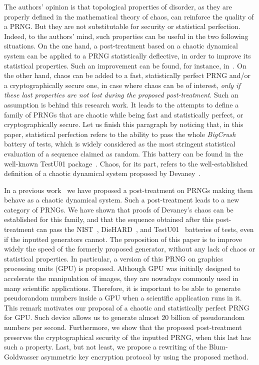 \documentclass{article}
\begin{document}
The authors' opinion is that topological properties of disorder, as they are
properly defined in the mathematical theory of chaos, can reinforce the quality
of a PRNG. But they are not substitutable for security or statistical perfection.
Indeed, to the authors' mind, such properties can be useful in the two following situations. On the
one hand, a post-treatment based on a chaotic dynamical system can be applied
to a PRNG statistically deflective, in order to improve its statistical 
properties. Such an improvement can be found, for instance, in~\cite{bgw09:ip,bcgr11:ip}.
On the other hand, chaos can be added to a fast, statistically perfect PRNG and/or a
cryptographically secure one, in case where chaos can be of interest,
\emph{only if these last properties are not lost during
the proposed post-treatment}. Such an assumption is behind this research work.
It leads to the attempts to define a 
family of PRNGs that are chaotic while being fast and statistically perfect,
or cryptographically secure.
Let us finish this paragraph by noticing that, in this paper, 
statistical perfection refers to the ability to pass the whole 
{\it BigCrush} battery of tests, which is widely considered as the most
stringent statistical evaluation of a sequence claimed as random.
This battery can be found in the well-known TestU01 package~\cite{LEcuyerS07}.
Chaos, for its part, refers to the well-established definition of a
chaotic dynamical system proposed by Devaney~\cite{Devaney}.


In a previous work~\cite{bgw09:ip,guyeux10} we have proposed a post-treatment on PRNGs making them behave
as a chaotic dynamical system. Such a post-treatment leads to a new category of
PRNGs. We have shown that proofs of Devaney's chaos can be established for this
family, and that the sequence obtained after this post-treatment can pass the
NIST~\cite{Nist10}, DieHARD~\cite{Marsaglia1996}, and TestU01~\cite{LEcuyerS07} batteries of tests, even if the inputted generators
cannot.
The proposition of this paper is to improve widely the speed of the formerly
proposed generator, without any lack of chaos or statistical properties.
In particular, a version of this PRNG on graphics processing units (GPU)
is proposed.
Although GPU was initially designed  to accelerate
the manipulation of  images, they are nowadays commonly  used in many scientific
applications. Therefore,  it is important  to be able to  generate pseudorandom
numbers inside a GPU when a scientific application runs in it. This remark
motivates our proposal of a chaotic and statistically perfect PRNG for GPU.  
Such device
allows us to generate almost 20 billion of pseudorandom numbers per second.
Furthermore, we show that the proposed post-treatment preserves the
cryptographical security of the inputted PRNG, when this last has such a 
property.
Last, but not least, we propose a rewriting of the Blum-Goldwasser asymmetric
key encryption protocol by using the proposed method.
\end{document}
